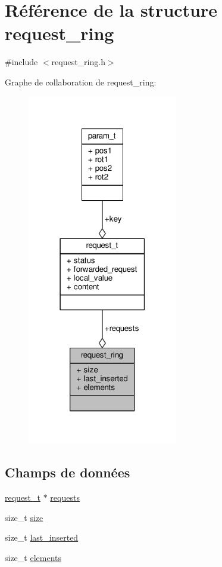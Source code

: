 \hypertarget{structrequest__ring}{\section{Référence de la structure request\+\_\+ring}
\label{structrequest__ring}
}


{\ttfamily \#include $<$request\+\_\+ring.\+h$>$}



Graphe de collaboration de request\+\_\+ring\+:\nopagebreak
\begin{figure}[H]
\begin{center}
\leavevmode
\includegraphics[width=186pt]{structrequest__ring__coll__graph}
\end{center}
\end{figure}
\subsection*{Champs de données}
\begin{DoxyCompactItemize}
\item 
\hyperlink{structrequest__t}{request\+\_\+t} $\ast$ \hyperlink{structrequest__ring_a22a253704723bc76a8620a53049b95e5}{requests}
\item 
size\+\_\+t \hyperlink{structrequest__ring_ad3a1e317fbca2bd780030d8a94b4eff8}{size}
\item 
size\+\_\+t \hyperlink{structrequest__ring_adef0d641c116af9f25ecd3ba2afbd901}{last\+\_\+inserted}
\item 
size\+\_\+t \hyperlink{structrequest__ring_a32380ec7244da66681fd9c320abf4686}{elements}
\end{DoxyCompactItemize}


